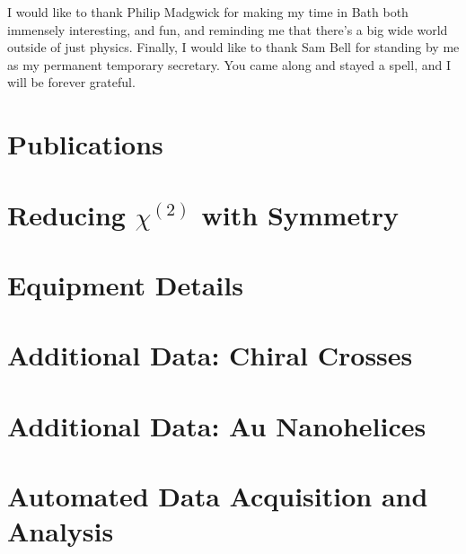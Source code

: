 \documentclass[11pt,a4paper,final]{report}
\begin{document}
I would like to thank Philip Madgwick for making my time in Bath both immensely interesting, and fun, and reminding me that there's a big wide world outside of just physics. Finally, I would like to thank Sam Bell for standing by me as my permanent temporary secretary. You came along and stayed a spell, and I will be forever grateful.

\chapter*{Publications}


\bigskip \noindent {}

\bigskip \noindent {}

\bigskip \noindent {}

\bigskip \noindent {}

\bigskip \noindent {}

\bigskip \noindent {}

\bigskip \noindent {}













%


\clearpage

\appendix
\chapter{Reducing \texorpdfstring{$\chi^{(2)}$}{Lg} with Symmetry}\label{sec:appendix:rotations}

\chapter{Equipment Details}\label{sec:appendix:Hardware}

\chapter{Additional Data: Chiral Crosses}\label{sec:appendix:AdditionalCrosses}

\chapter{Additional Data: Au Nanohelices}\label{sec:appendix:AdditionalAuHelix}

\chapter{Automated Data Acquisition and Analysis}\label{sec:appendix:Code}

\end{document}
